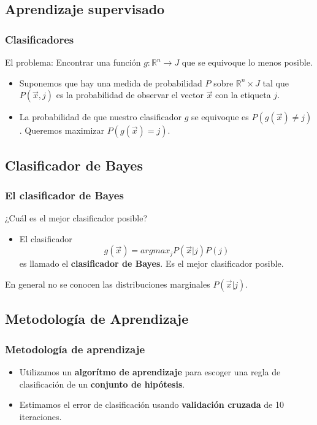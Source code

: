 \documentclass{beamer}
\begin{document}
\subsection{Aprendizaje supervisado}
\begin{frame}%
\frametitle{Clasificadores}
El problema: Encontrar una función $g:\mathbb{R}^n\to J  $ que se equivoque lo menos posible.
\begin{itemize}
  \item Suponemos que hay una medida de probabilidad $P$ sobre $\mathbb{R}^n\times J$ tal que $P(\vec{x}, j)$ es la probabilidad de observar el vector $\vec{x}$ con la etiqueta $j$.
  \item La probabilidad de que nuestro clasificador $g$ se equivoque es $P(g(\vec{x}) \neq j)$. Queremos maximizar $P(g(\vec{x}) = j)$.
  \end{itemize}
\end{frame}


\subsection{Clasificador de Bayes}
\begin{frame}%
  \frametitle{El clasificador de Bayes}
  ¿Cuál es el mejor clasificador posible?
  \begin{itemize} 
  \item El clasificador
    \begin{equation}
      g(\vec{x}) = argmax_{j}P(\vec{x}|j)P(j)
    \end{equation}
    es llamado el \textbf{clasificador de Bayes}. Es el mejor clasificador posible.
  \end{itemize}
  En general no se conocen las distribuciones marginales $P(\vec{x}|j)$.
\end{frame}

\subsection{Metodología de Aprendizaje}
\begin{frame} %
  \frametitle{Metodología de aprendizaje}
  \begin{itemize}
  \item Utilizamos un \textbf{algorítmo de aprendizaje} para escoger una regla de clasificación de un \textbf{conjunto de hipótesis}.
  \item Estimamos el error de clasificación usando \textbf{validación cruzada} de 10 iteraciones.
  \end{itemize}
\end{frame}
\end{document}
